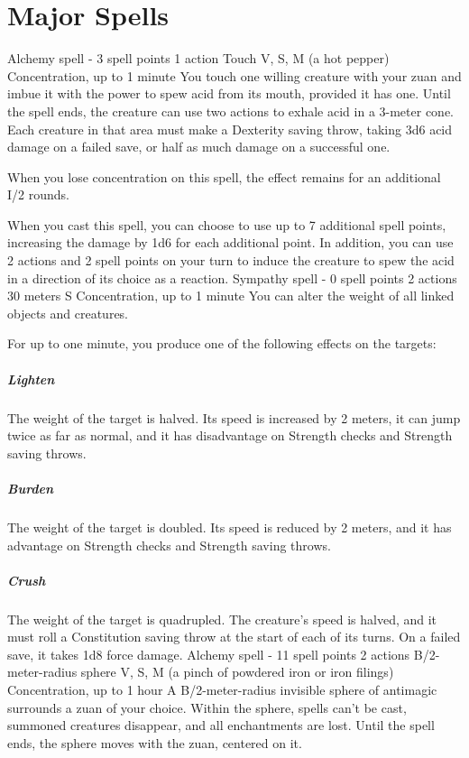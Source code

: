 \section{Major Spells} \label{sec::majorspells}
    {Alchemy spell - 3 spell points}
    {1 action}
    {Touch}
    {V, S, M (a hot pepper)}
    {Concentration, up to 1 minute}
    You touch one willing creature with your zuan and imbue it with the power to spew acid from its mouth, provided it has one.
    Until the spell ends, the creature can use two actions to exhale acid in a 3-meter cone.
    Each creature in that area must make a Dexterity saving throw, taking 3d6 acid damage on a failed save, or half as much damage on a successful one.

    When you lose concentration on this spell, the effect remains for an additional I/2 rounds.

    When you cast this spell, you can choose to use up to 7 additional spell points, increasing the damage by 1d6 for each additional point.
    In addition, you can use 2 actions and 2 spell points on your turn to induce the creature to spew the acid in a direction of its choice as a reaction.
    {Sympathy spell - 0 spell points}
    {2 actions}
    {30 meters}
    {S}
    {Concentration, up to 1 minute}
    You can alter the weight of all linked objects and creatures.

    For up to one minute, you produce one of the following effects on the targets:
    \subparagraph{Lighten}
    The weight of the target is halved.
    Its speed is increased by 2 meters, it can jump twice as far as normal, and it has disadvantage on Strength checks and Strength saving throws.
    \subparagraph{Burden}
    The weight of the target is doubled.
    Its speed is reduced by 2 meters, and it has advantage on Strength checks and Strength saving throws.
    \subparagraph{Crush}
    The weight of the target is quadrupled.
    The creature's speed is halved, and it must roll a Constitution saving throw at the start of each of its turns.
    On a failed save, it takes 1d8 force damage.
    {Alchemy spell - 11 spell points}
    {2 actions}
    {B/2-meter-radius sphere}
    {V, S, M (a pinch of powdered iron or iron filings)}
    {Concentration, up to 1 hour}
    A B/2-meter-radius invisible sphere of antimagic surrounds a zuan of your choice.
    Within the sphere, spells can't be cast, summoned creatures disappear, and all enchantments are lost.
    Until the spell ends, the sphere moves with the zuan, centered on it.

